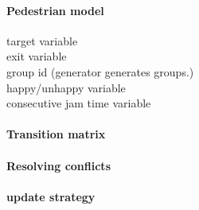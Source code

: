 \documentclass[paper=a4, fontsize=11pt]{article} %
\begin{document}
\paragraph{Pedestrian model}
target variable \\
exit variable \\
group id (generator generates groups.) \\
happy/unhappy variable \\
consecutive jam time variable \\

\paragraph{Transition matrix}

\paragraph{Resolving conflicts}

\paragraph{update strategy}

\end{document}
